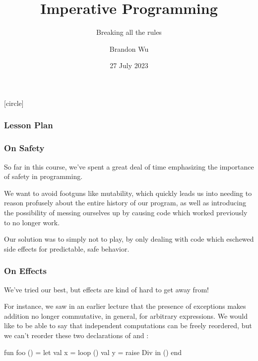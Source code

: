 \documentclass[aspectratio=169, handout]{beamer}
\title{Imperative Programming} %
\subtitle{Breaking all the rules} %
\date{27 July 2023} %
\author{Brandon Wu} %
\newif\ifcolorlambda
\begin{document}
\ifweb
    \renewcommand{\pause}{}
\fi

[circle]

{
\begin{frame}[plain]
    \colorlambdatrue
    \titlepage
\end{frame}
}


\begin{frame}[fragile]
  \frametitle{Lesson Plan}

  \tableofcontents
\end{frame}


\begin{frame}[fragile]
  \frametitle{On Safety}

  So far in this course, we've spent a great deal of time emphasizing the
  importance of safety in programming.

  \pause
  \vspace{\fill}

  We want to avoid footguns like mutability, which quickly leads us into
  needing to reason profusely about the entire history of our program, as well as
  introducing the possibility of messing ourselves up by causing code which worked
  previously to no longer work.

  \pause
  \vspace{\fill}

  Our solution was to simply not to play, by only dealing with  code
  which eschewed side effects for predictable, safe behavior.
\end{frame}

\begin{frame}[fragile]
  \frametitle{On Effects}

  We've tried our best, but effects are kind of hard to get away from!

  \pause
  \vspace{\fill}

  For instance, we saw in an earlier lecture that the presence of exceptions makes
  addition no longer commutative, in general, for arbitrary expressions. We would
  like to be able to say that independent computations can be freely reordered,
  but we can't reorder these two declarations of  and :

  \pause
  \vspace{\fill}

  \begin{codeblock}
    fun foo () =
      let
        val x = loop ()
        val y = raise Div
      in
        ()
      end
  \end{codeblock}
\end{frame}
\end{document}
